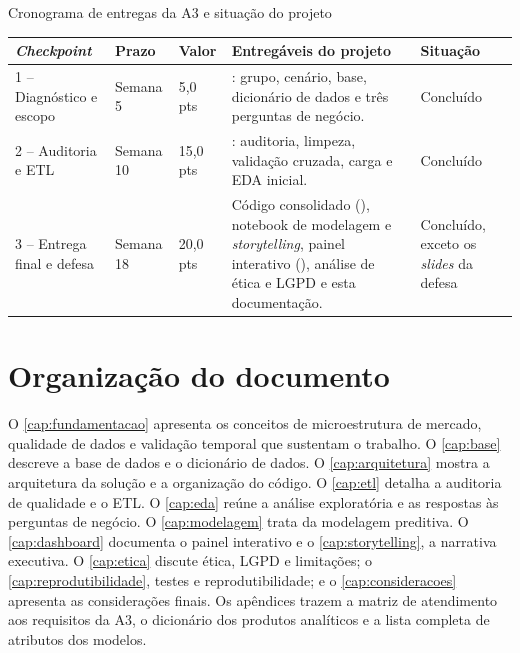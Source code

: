 \begin{quadro}[htbp]
\caption{\label{qua:checkpoints}Cronograma de entregas da A3 e situação do projeto}
\begin{corpotabela}
\begin{tabularx}{\textwidth}{|L{3.0cm}|C{1.5cm}|C{1.3cm}|Y|L{2.6cm}|}
\hline
\textbf{\textit{Checkpoint}} & \textbf{Prazo} & \textbf{Valor} & \textbf{Entregáveis do projeto} & \textbf{Situação} \\  -- Diagnóstico e escopo & Semana 5 & 5,0 pts &
: grupo, cenário, base, dicionário de dados e três
perguntas de negócio. & Concluído \\  -- Auditoria e ETL & Semana 10 & 15,0 pts &
: auditoria, limpeza, validação
cruzada, carga e EDA inicial. & Concluído \\  -- Entrega final e defesa & Semana 18 & 20,0 pts &
Código consolidado (), notebook de modelagem e
\textit{storytelling}, painel interativo (), análise de ética e LGPD
e esta documentação. & Concluído, exceto os \textit{slides} da defesa \\ \hline
\end{tabularx}
\end{corpotabela}
\end{quadro}

\section{Organização do documento}\label{sec:organizacao}

O \autoref{cap:fundamentacao} apresenta os conceitos de microestrutura de
mercado, qualidade de dados e validação temporal que sustentam o trabalho. O
\autoref{cap:base} descreve a base de dados e o dicionário de dados. O
\autoref{cap:arquitetura} mostra a arquitetura da solução e a organização do
código. O \autoref{cap:etl} detalha a auditoria de qualidade e o ETL. O
\autoref{cap:eda} reúne a análise exploratória e as respostas às perguntas de
negócio. O \autoref{cap:modelagem} trata da modelagem preditiva. O
\autoref{cap:dashboard} documenta o painel interativo e o
\autoref{cap:storytelling}, a narrativa executiva. O \autoref{cap:etica}
discute ética, LGPD e limitações; o \autoref{cap:reprodutibilidade}, testes e
reprodutibilidade; e o \autoref{cap:consideracoes} apresenta as considerações
finais. Os apêndices trazem a matriz de atendimento aos requisitos da A3, o
dicionário dos produtos analíticos e a lista completa de atributos dos
modelos.
